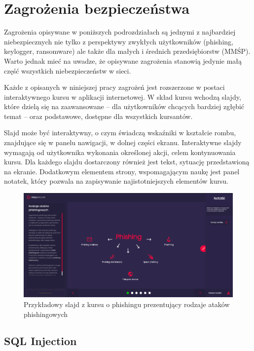\documentclass[12pt,twoside]{article}
\begin{document}
\clearpage
\section{Zagrożenia bezpieczeństwa}

Zagrożenia opisywane w poniższych podrozdziałach są jednymi z najbardziej niebezpiecznych nie tylko z perspektywy zwykłych użytkowników (phishing, keylogger, ransomware) ale także dla małych i średnich przedsiębiorstw (MMŚP). Warto jednak mieć na uwadze, że opisywane zagrożenia stanowią jedynie małą część wszystkich niebezpieczeństw w sieci.

Każde z opisanych w niniejszej pracy zagrożeń jest rozszerzone w postaci interaktywnego kursu w aplikacji internetowej. W skład kursu wchodzą slajdy, które dzielą się na zaawansowane -- dla użytkowników chcących bardziej zgłębić temat -- oraz podstawowe, dostępne dla wszystkich kursantów. 

Slajd może być interaktywny, o czym świadczą wskaźniki w kształcie rombu, znajdujące się w panelu nawigacji, w dolnej części ekranu. Interaktywne slajdy wymagają od użytkownika wykonania określonej akcji, celem kontynuowania kursu. Dla każdego slajdu dostarczony również jest tekst, sytuację przedstawioną na ekranie. Dodatkowym elementem strony, wspomagającym naukę jest panel notatek, który pozwala na zapisywanie najistotniejszych elementów kursu.

\begin{figure}[H]
	\centering
	\includegraphics[width=1\linewidth]{figures/slide-tutorial}
	\caption{Przykładowy slajd z kursu o phishingu prezentujący rodzaje ataków phishingowych}
\end{figure}

\clearpage
\subsection{SQL Injection}
\end{document}
